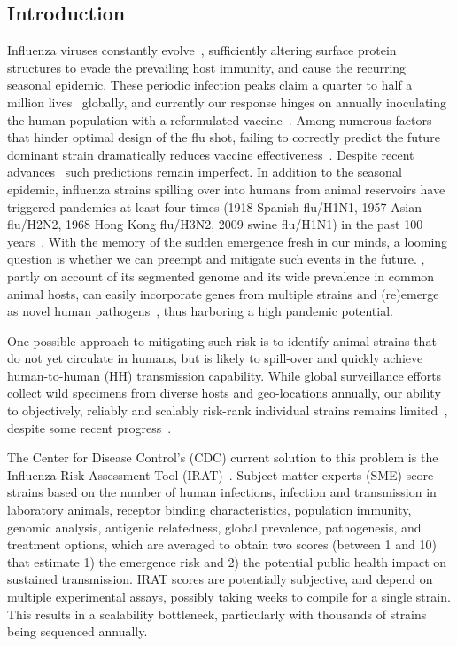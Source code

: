 \documentclass[onecolumn, compsoc,10pt]{IEEEtran}
\begin{document}
\subsection*{Introduction}
Influenza viruses constantly evolve~\cite{dos2016influenza}, sufficiently altering surface protein structures to evade the prevailing host immunity, and cause the recurring seasonal  epidemic. These periodic  infection peaks claim a quarter to half a million lives~\cite{huddleston2020integrating} globally,  and currently our response hinges on annually  inoculating  the  human population with a  reformulated  vaccine~\cite{boni2008vaccination,dos2016influenza}.  Among numerous factors that hinder optimal design of the flu shot, failing to correctly predict the future dominant strain  dramatically reduces vaccine effectiveness~\cite{tricco2013comparing}. Despite  recent advances~\cite{neher2014predicting,huddleston2020integrating} such predictions remain imperfect. In addition to  the seasonal  epidemic, influenza strains spilling over into humans from animal reservoirs have triggered  pandemics  at least four times (1918 Spanish flu/H1N1, 1957 Asian flu/H2N2, 1968 Hong Kong flu/H3N2, 2009 swine flu/H1N1) in the past 100 years~\cite{shao2017evolution}. With the memory of the  sudden \hcov emergence
fresh in our minds, a looming question  is whether we can  preempt and mitigate such events in the future. \infl, partly on account of its segmented genome and its wide prevalence in common animal hosts, can easily incorporate genes from multiple strains and (re)emerge as novel human pathogens~\cite{reid2003origin,vergara2014ns}, thus harboring  a high pandemic potential.



One possible approach to mitigating such risk is to identify  animal strains  that do not yet circulate in humans, but is likely to spill-over and quickly achieve human-to-human (HH) transmission capability. While global surveillance efforts collect wild specimens from diverse hosts and geo-locations annually, our  ability to objectively, reliably and scalably  risk-rank individual strains remains limited~\cite{wille2021accurately}, despite some recent progress~\cite{pulliam2009ability,grewelle2020larger,grange2021ranking}.
 
The Center for Disease Control's (CDC) current solution to this problem is the Influenza Risk Assessment Tool (IRAT)~\cite{Influenz24:online}.  Subject matter experts (SME) 
  score strains based on  the number of  human infections, infection and transmission in laboratory animals, receptor binding characteristics, population immunity, genomic analysis, antigenic relatedness, global prevalence,  pathogenesis, and  treatment options, which are averaged to obtain two scores (between 1 and 10) that  estimate 1) the emergence  risk and 2) the potential public health impact on sustained transmission. IRAT scores  are potentially subjective, and  depend on multiple experimental assays, possibly taking  weeks to compile for a single strain. This results in  a scalability bottleneck, particularly with    thousands of strains being sequenced annually.
\end{document}
